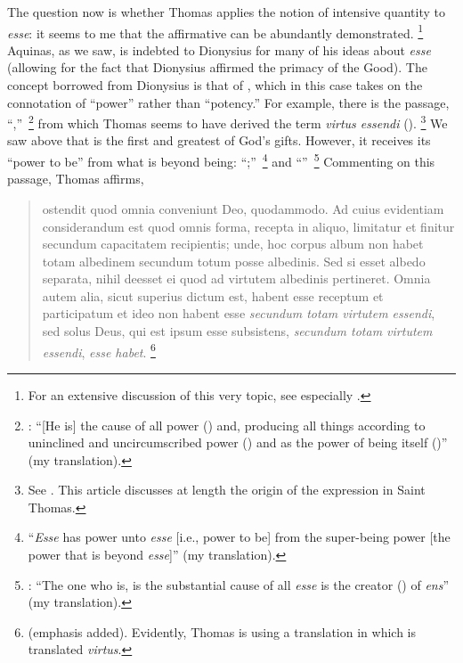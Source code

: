 The question now is whether Thomas applies the notion of intensive quantity to \emph{esse}: it seems to me that the affirmative can be abundantly demonstrated.%
%
\footnote{For an extensive discussion of this very topic, see especially \cite{orourke:virtus}.} Aquinas, as we saw, is indebted to Dionysius for many of his ideas about \emph{esse} (allowing for the fact that Dionysius affirmed the primacy of the Good). The concept borrowed from Dionysius is that of , which in this case takes on the connotation of ``power'' rather than ``potency.'' For example, there is the passage, ``,''\,%
%
\footnote{\Cite[8, 2]{pg:dionysius:DN}: ``[He is] the cause of all power () and, producing all things according to uninclined and uncircumscribed power () and as the power of being itself ()'' (my translation). }
%
from which Thomas seems to have derived the term \emph{virtus essendi} ().%
%
\footnote{See \cite[1]{gilson:virtus}. This article discusses at length the origin of the expression in Saint Thomas.}
%
We saw above that  is the first and greatest of God's gifts. However, it receives its ``power to be'' from what is beyond being: ``;''\,%
%
\footnote{\Cite[8, 3]{pg:dionysius:DN} ``\emph{Esse} has power unto \emph{esse} [i.e., power to be] from the super-being power [the power that is beyond \emph{esse}]'' (my translation).} and ``''\,%
%
\footnote{\Cite[5, 4]{pg:dionysius:DN}: ``The one who is, is the substantial cause of all \emph{esse} is the creator () of \emph{ens}'' (my translation).} Commenting on this passage, Thomas affirms,
%
\begin{quotation}
ostendit quod omnia conveniunt Deo, quodammodo. Ad cuius evidentiam considerandum est quod omnis forma, recepta in aliquo, limitatur et finitur secundum capacitatem recipientis; unde, hoc corpus album non habet totam albedinem secundum totum posse albedinis. Sed si esset albedo separata, nihil deesset ei quod ad virtutem albedinis pertineret. Omnia autem alia, sicut superius dictum est, habent esse receptum et participatum et ideo non habent esse \emph{secundum totam virtutem essendi}, sed solus Deus, qui est ipsum esse subsistens, \emph{secundum totam virtutem essendi}, \emph{esse habet}.%
%
\footnote{\Cite[V, lc.~1, 629]{st:divnomin} (emphasis added). Evidently, Thomas is using a translation in which  is translated \emph{virtus}.}
\end{quotation}
